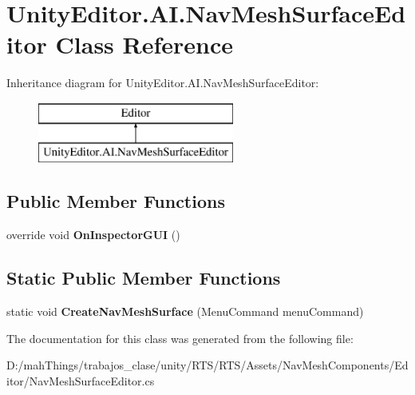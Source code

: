 \hypertarget{class_unity_editor_1_1_a_i_1_1_nav_mesh_surface_editor}{}\section{Unity\+Editor.\+A\+I.\+Nav\+Mesh\+Surface\+Editor Class Reference}
\label{class_unity_editor_1_1_a_i_1_1_nav_mesh_surface_editor}
Inheritance diagram for Unity\+Editor.\+A\+I.\+Nav\+Mesh\+Surface\+Editor\+:\begin{figure}[H]
\begin{center}
\leavevmode
\includegraphics[height=2.000000cm]{class_unity_editor_1_1_a_i_1_1_nav_mesh_surface_editor}
\end{center}
\end{figure}
\subsection*{Public Member Functions}
\begin{DoxyCompactItemize}
\item 
\mbox{\label{class_unity_editor_1_1_a_i_1_1_nav_mesh_surface_editor_ac5e76f0631254a0c3bbd9416b37f92eb}} 
override void {\bfseries On\+Inspector\+G\+UI} ()
\end{DoxyCompactItemize}
\subsection*{Static Public Member Functions}
\begin{DoxyCompactItemize}
\item 
\mbox{\label{class_unity_editor_1_1_a_i_1_1_nav_mesh_surface_editor_aef0aa706a714ba527984e415a08cbf3c}} 
static void {\bfseries Create\+Nav\+Mesh\+Surface} (Menu\+Command menu\+Command)
\end{DoxyCompactItemize}


The documentation for this class was generated from the following file\+:\begin{DoxyCompactItemize}
\item 
D\+:/mah\+Things/trabajos\+\_\+clase/unity/\+R\+T\+S/\+R\+T\+S/\+Assets/\+Nav\+Mesh\+Components/\+Editor/Nav\+Mesh\+Surface\+Editor.\+cs\end{DoxyCompactItemize}
